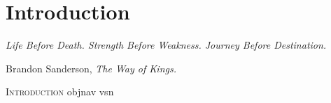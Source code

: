 \chapter{Introduction}
\label{ch:introduction}

\setlength{}
\epigraph{\itshape Life Before Death. Strength Before Weakness. Journey Before Destination.}{Brandon Sanderson, \textit{The Way of Kings.}}

\lettrine{\textcolor{accent_color}{I}}{ntroduction} \acrshort{objnav} \acrfull{vsn} \lipsum[1-4]